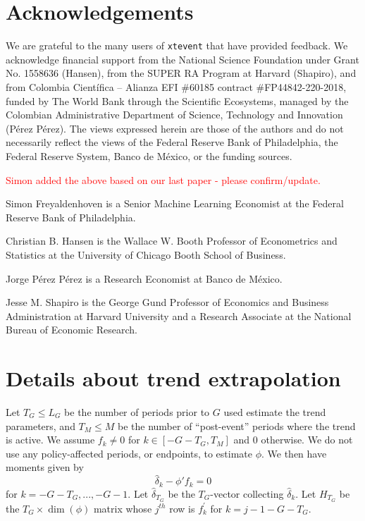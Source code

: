 \documentclass[bib]{./sty/statapress}
\begin{document}
\section{Acknowledgements}
We are grateful to the many users of \texttt{xtevent} that have provided feedback. We acknowledge financial support from the National Science Foundation under Grant No. 1558636 (Hansen), from the SUPER RA Program at Harvard (Shapiro), and from Colombia Cient\'{i}fica – Alianza EFI \#60185 contract \#FP44842-220-2018, funded by The World Bank through the Scientific Ecosystems, managed by the Colombian Administrative Department of Science, Technology and Innovation (P\'{e}rez P\'{e}rez). The views expressed herein are those of the authors and do not necessarily reflect the views of the Federal Reserve Bank of Philadelphia, the Federal Reserve System, Banco de M\'exico, or the funding sources. 

\textcolor{red}{Simon added the above based on our last paper - please confirm/update.}
%
%




\begin{aboutauthors}
Simon Freyaldenhoven is a Senior Machine Learning Economist at the Federal Reserve Bank of Philadelphia.

Christian B. Hansen is the Wallace W. Booth Professor of Econometrics and Statistics at the University of Chicago Booth School of Business.

Jorge P\'erez P\'erez is a Research Economist at Banco de México.

Jesse M. Shapiro is the George Gund Professor of Economics and Business Administration at Harvard University and a Research Associate at the National Bureau of Economic Research.

\end{aboutauthors}


\clearpage

\appendix

\section{Details about trend extrapolation}
\label{sec:app_trend}
Let $T_G \leq L_G$ be the number of periods prior to $G$ used estimate the trend parameters, and $T_M \leq M$ be the number of ``post-event'' periods where the trend is active.
We assume $f_k \neq 0$ for $k \in \left[-G-T_G,T_M \right]$ and $0$ otherwise.
We do not use any policy-affected periods, or endpoints, to estimate $\phi$.
We then have moments given by
\[
\widehat{\delta}_{k}-\phi'f_{k}=0
\]
for $k=-G-T_G,...,-G-1$. Let $\widehat{\delta}_{T_G}$ be the $T_{G}$-vector
collecting $\widehat{\delta}_{k}$. Let $H_{T_G}$ be the $T_{G}\times\dim\left(\phi\right)$
matrix whose $j^{th}$ row is $f_{k}^{'}$ for $k=j-1-G-T_{G}$.
\end{document}
